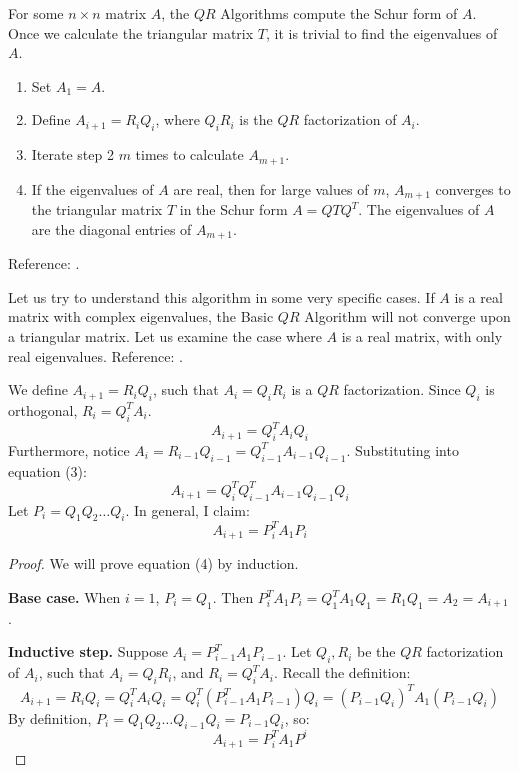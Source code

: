 \documentclass{article}
\begin{document}
For some $n\times n$ matrix $A$, the $QR$ Algorithms compute the Schur form of $A$. Once we calculate the triangular matrix $T$, it is trivial to find the eigenvalues of $A$.

\begin{tcolorbox}[title={Basic $QR$ Algorithm},colback=red!5!white,colframe=red!75!black,parbox=false]
	\begin{enumerate}
		\item Set $A_1=A$.
		\item Define $A_{i+1}=R_iQ_i$, where $Q_iR_i$ is the $QR$ factorization of $A_i$.
		\item Iterate step 2 $m$ times to calculate $A_{m+1}$.
		\item If the eigenvalues of $A$ are real, then for large values of $m$, $A_{m+1}$ converges to the triangular matrix $T$ in the Schur form $A=QTQ^T$. The eigenvalues of $A$ are the diagonal entries of $A_{m+1}$.
	\end{enumerate}
	Reference: \cite[64]{ethbook}.
\end{tcolorbox}
Let us try to understand this algorithm in some very specific cases. If $A$ is a real matrix with complex eigenvalues, the Basic $QR$ Algorithm will not converge upon a triangular matrix. Let us examine the case where $A$ is a real matrix, with only real eigenvalues. Reference: \cite{rutgers}.

We define $A_{i+1}=R_iQ_i$, such that $A_i=Q_iR_i$ is a $QR$ factorization. Since $Q_i$ is orthogonal, $R_i=Q_i^TA_i$. 
\begin{equation}
    A_{i+1}=Q_i^T A_i Q_i
\end{equation}
Furthermore, notice $A_i=R_{i-1}Q_{i-1}=Q_{i-1}^T A_{i-1} Q_{i-1}$. Substituting into equation (3):
\begin{equation*}
	A_{i+1}=Q_i^T Q_{i-1}^T A_{i-1} Q_{i-1} Q_i
\end{equation*}
Let $P_i=Q_1Q_2\ldots Q_i$. In general, I claim:
\begin{equation}
	A_{i+1}=P_i^T A_1 P_i
\end{equation}

\begin{tcolorbox}[colback=blue!5!white,colframe=blue!75!black,parbox=false]
\begin{proof}
	We will prove equation (4) by induction.

	\textbf{Base case.} When $i=1$, $P_i=Q_1$. Then $P_i^T A_1 P_i=Q_1^T A_1 Q_1=R_1Q_1=A_2=A_{i+1}$.

	\textbf{Inductive step.} Suppose $A_i=P_{i-1}^T A_1 P_{i-1}$. Let $Q_i,R_i$ be the $QR$ factorization of $A_i$, such that $A_i=Q_iR_i$, and $R_i=Q_i^T A_i$. Recall the definition:
	\begin{equation*}
		A_{i+1}
		=R_iQ_i
		=Q_i^T A_i Q_i
		=Q_i^T \left(P_{i-1}^T A_1 P_{i-1}\right) Q_i
		=\left(P_{i-1} Q_i\right)^T A_1 \left(P_{i-1}Q_i\right)
	\end{equation*}
	By definition, $P_i=Q_1Q_2\ldots Q_{i-1}Q_i=P_{i-1}Q_i$, so:
	\begin{equation*}
		A_{i+1}=P_i^T A_1 P^i
	\end{equation*}
\end{proof}
\end{tcolorbox}
\end{document}
